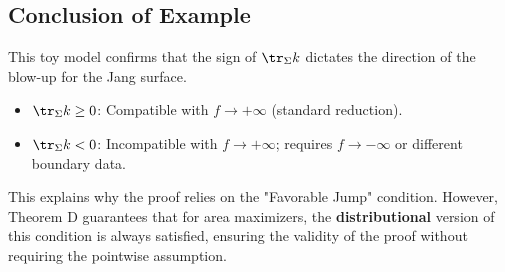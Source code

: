 \subsection{Conclusion of Example}
This toy model confirms that the sign of $\tr_\Sigma k$ dictates the direction of the blow-up for the Jang surface.
\begin{itemize}
    \item $\tr_\Sigma k \ge 0$: Compatible with $f \to +\infty$ (standard reduction).
    \item $\tr_\Sigma k < 0$: Incompatible with $f \to +\infty$; requires $f \to -\infty$ or different boundary data.
\end{itemize}
This explains why the proof relies on the "Favorable Jump" condition. However, Theorem D guarantees that for area maximizers, the \textbf{distributional} version of this condition is always satisfied, ensuring the validity of the proof without requiring the pointwise assumption.
